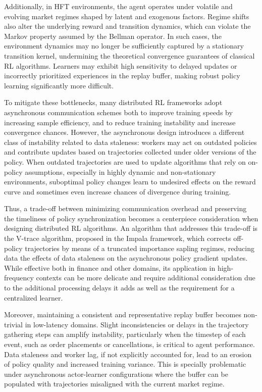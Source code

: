 Additionally, in HFT environments, the agent operates under volatile and evolving market regimes shaped by latent and exogenous factors.
Regime shifts also alter the underlying reward and transition dynamics, which can violate the Markov property assumed by the Bellman operator.
In such cases, the environment dynamics may no longer be sufficiently captured by a stationary transition kernel,
undermining the theoretical convergence guarantees of classical RL algorithms.
Learners may exhibit high sensitivity to delayed updates or incorrectly prioritized experiences in the replay buffer,
making robust policy learning significantly more difficult.

To mitigate these bottlenecks, many distributed RL frameworks adopt asynchronous communication schemes both
to improve training speeds by increasing sample efficiency, and to reduce training instability and increase convergence chances.
However, the asynchronous design introduces a different class of instability related to data staleness:
workers may act on outdated policies and contribute updates based on trajectories collected under older versions of the policy.
When outdated trajectories are used to update algorithms that rely on on-policy assumptions,
especially in highly dynamic and non-stationary environments,
suboptimal policy changes learn to undesired effects on the reward curve and sometimes even increase chances of divergence during training.

Thus, a trade-off between minimizing communication overhead and preserving the timeliness of policy synchronization
becomes a centerpiece consideration when designing distributed RL algorithms.
An algorithm that addresses this trade-off is the V-trace algorithm, proposed in the Impala framework,
which corrects off-policy trajectories by means of a truncated importance sapling regimes,
reducing data the effects of data staleness on the asynchronous policy gradient updates.
While effective both in finance and other domains, its application in high-frequency contexts can be more delicate
and require additional consideration due to the additional processing delays it adds as well as the requirement for a
centralized learner.

Moreover, maintaining a consistent and representative replay buffer becomes non-trivial in low-latency domains.
Slight inconsistencies or delays in the trajectory gathering steps can amplify instability,
particularly when the timestep of each event, such as order placements or cancellations, is critical to agent performance.
Data staleness and worker lag, if not explicitly accounted for, lead to an erosion of policy quality and increased training variance.
This is specially problematic under asynchronous actor-learner configurations where the buffer can be populated with trajectories misaligned with the current market regime.

